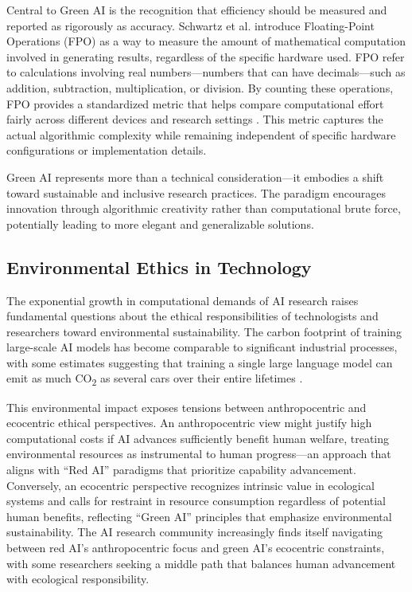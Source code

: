 \documentclass[twoside]{ai_ethics_class}
\begin{document}
Central to Green AI is the recognition that efficiency should be measured and reported as rigorously as accuracy.
Schwartz et al. introduce Floating-Point Operations (FPO) as a way to measure the amount of mathematical computation involved in generating results, regardless of the specific hardware used.
FPO refer to calculations involving real numbers—numbers that can have decimals—such as addition, subtraction, multiplication, or division. By counting these operations, FPO provides a standardized metric that helps compare computational effort fairly across different devices and research settings \cite{schwartz2020green}.
This metric captures the actual algorithmic complexity while remaining independent of specific hardware configurations or implementation details.

Green AI represents more than a technical consideration—it embodies a shift toward sustainable and inclusive research practices.
The paradigm encourages innovation through algorithmic creativity rather than computational brute force, potentially leading to more elegant and generalizable solutions.

\subsection{Environmental Ethics in Technology}

The exponential growth in computational demands of AI research raises fundamental questions about the ethical responsibilities of technologists and researchers toward environmental sustainability.
The carbon footprint of training large-scale AI models has become comparable to significant industrial processes, with some estimates suggesting that training a single large language model can emit as much CO\textsubscript{2} as several cars over their entire lifetimes \cite{strubell2019energy}.

This environmental impact exposes tensions between anthropocentric and ecocentric ethical perspectives.
An anthropocentric view might justify high computational costs if AI advances sufficiently benefit human welfare, treating environmental resources as instrumental to human progress—an approach that aligns with ``Red AI'' paradigms that prioritize capability advancement.
Conversely, an ecocentric perspective recognizes intrinsic value in ecological systems and calls for restraint in resource consumption regardless of potential human benefits, reflecting ``Green AI'' principles that emphasize environmental sustainability.
The AI research community increasingly finds itself navigating between red AI's anthropocentric focus and green AI's ecocentric constraints, with some researchers seeking a middle path that balances human advancement with ecological responsibility.
\end{document}
